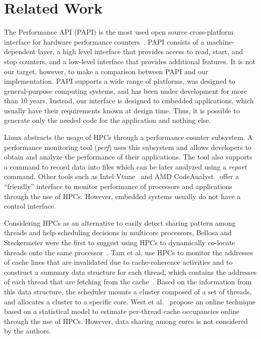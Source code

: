 \documentclass[conference]{IEEEtran}
\begin{document}
\section{Related Work}
\label{sec:related_work}

The Performance API (PAPI) is the most used open source cross-platform interface for hardware performance counters~\cite{Dongarra:2003,papi}. PAPI consists of a machine-dependent layer, a high level interface that provides access to read, start, and stop counters, and a low-level interface that provides additional features. It is not our target, however, to make a comparison between PAPI and our implementation. PAPI supports a wide range of platforms, was designed to general-purpose computing systems, and has been under development for more than 10 years. Instead, our interface is designed to embedded applications, which usually have their requirements known at design time. Thus, it is possible to generate only the needed code for the application and nothing else.

Linux abstracts the usage of HPCs through a performance counter subsystem. A performance monitoring tool (\emph{perf}) uses this subsystem and allows developers to obtain and analyze the performance of their applications. The tool also supports a command to record data into files which can be later analyzed using a \emph{report} command. Other tools such as Intel Vtune~\cite{intelperf} and AMD CodeAnalyst~\cite{codeanalyst} offer a ``friendly'' interface to monitor performance of processors and applications through the use of HPCs. However, embedded systems usually do not have a control interface. 

Considering HPCs as an alternative to easily detect sharing pattern among threads and help scheduling decisions in multicore processors, Bellosa and Steckermeier were the first to suggest using HPCs to dynamically co-locate threads onto the same processor~\cite{Bellosa:1996}. Tam et al. use HPCs to monitor the addresses of cache lines that are invalidated due to cache-coherence activities and to construct a summary data structure for each thread, which contains the addresses of each thread that are fetching from the cache~\cite{Tam:2007}. Based on the information from this data structure, the scheduler mounts a cluster composed of a set of threads, and allocates a cluster to a specific core. West et al.~\cite{West:2010} propose an online technique based on a statistical model to estimate per-thread cache occupancies online through the use of HPCs. However, data sharing among cores is not considered by the authors.
\end{document}
